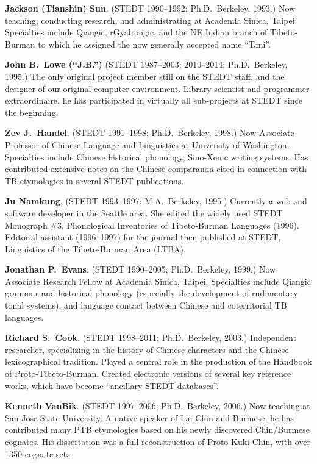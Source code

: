 \textbf{Jackson (Tianshin) Sun}. (STEDT 1990–1992; Ph.D.\ Berkeley, 1993.) Now teaching, conducting research, and administrating at Academia Sinica, Taipei. Specialties include Qiangic, rGyalrongic, and the NE Indian branch of Tibeto-Burman to which he assigned the now generally accepted name “Tani”.

\textbf{John B.\ Lowe (“J.B.”)} (STEDT 1987–2003; 2010–2014; Ph.D.\ Berkeley, 1995.) The only original project member still on the STEDT staff, and the designer of our original computer environment. Library scientist and programmer extraordinaire, he has participated in virtually all sub-projects at STEDT since the beginning.

\textbf{Zev J.\ Handel}. (STEDT 1991–1998; Ph.D.\ Berkeley, 1998.) Now Associate Professor of Chinese Language and Linguistics at University of Washington. Specialties include Chinese historical phonology, Sino-Xenic writing systems. Has contributed extensive notes on the Chinese comparanda cited in connection with TB etymologies in several STEDT publications.

\textbf{Ju Namkung}. (STEDT 1993–1997; M.A.\ Berkeley, 1995.) Currently a web and software developer in the Seattle area. She edited the widely used STEDT Monograph \#3, Phonological Inventories of Tibeto-Burman Languages (1996). Editorial assistant (1996–1997) for the journal then published at STEDT, Linguistics of the Tibeto-Burman Area (LTBA).

\textbf{Jonathan P.\ Evans}. (STEDT 1990–2005; Ph.D.\ Berkeley, 1999.) Now Associate Research Fellow at Academia Sinica, Taipei. Specialties include Qiangic grammar and historical phonology (especially the development of rudimentary tonal systems), and language contact between Chinese and coterritorial TB languages.

\textbf{Richard S.\ Cook}. (STEDT 1998–2011; Ph.D.\ Berkeley, 2003.) Independent researcher, specializing in the history of Chinese characters and the Chinese lexicographical tradition. Played a central role in the production of the Handbook of Proto-Tibeto-Burman. Created electronic versions of several key reference works, which have become “ancillary STEDT databases”.

\textbf{Kenneth VanBik}. (STEDT 1997–2006; Ph.D.\ Berkeley, 2006.) Now teaching at San Jose State University. A native speaker of Lai Chin and Burmese, he has contributed many PTB etymologies based on his newly discovered Chin/Burmese cognates. His dissertation was a full reconstruction of Proto-Kuki-Chin, with over 1350 cognate sets.


